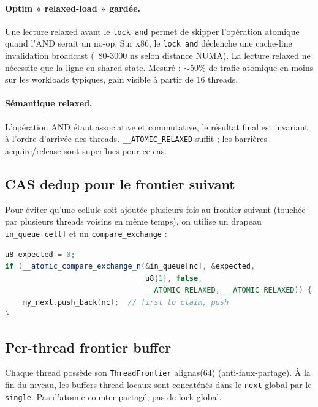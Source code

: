 \paragraph{Optim « relaxed-load » gardée.} Une lecture relaxed avant le \texttt{lock and} permet de skipper l'opération atomique quand l'AND serait un no-op. Sur x86, le \texttt{lock and} déclenche une cache-line invalidation broadcast (~80-3000 ns selon distance NUMA). La lecture relaxed ne nécessite que la ligne en shared state. Mesuré : $\sim 50\%$ de trafic atomique en moins sur les workloads typiques, gain visible à partir de 16 threads.

\paragraph{Sémantique relaxed.} L'opération AND étant associative et commutative, le résultat final est invariant à l'ordre d'arrivée des threads. \texttt{\_\_ATOMIC\_RELAXED} suffit ; les barrières acquire/release sont superflues pour ce cas.

\subsection{CAS dedup pour le frontier suivant}

Pour éviter qu'une cellule soit ajoutée plusieurs fois au frontier suivant (touchée par plusieurs threads voisins en même temps), on utilise un drapeau \texttt{in\_queue[cell]} et un \texttt{compare\_exchange} :

\begin{lstlisting}[language=C++]
u8 expected = 0;
if (__atomic_compare_exchange_n(&in_queue[nc], &expected,
                                u8{1}, false,
                                __ATOMIC_RELAXED, __ATOMIC_RELAXED)) {
    my_next.push_back(nc);  // first to claim, push
}
\end{lstlisting}

\subsection{Per-thread frontier buffer}

Chaque thread possède son \texttt{ThreadFrontier} alignas(64) (anti-faux-partage). À la fin du niveau, les buffers thread-locaux sont concaténés dans le \texttt{next} global par le \texttt{single}. Pas d'atomic counter partagé, pas de lock global.

